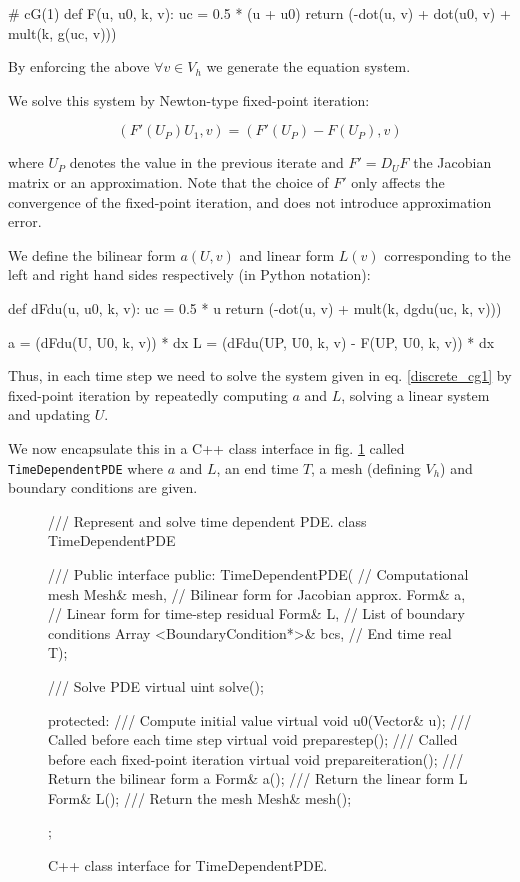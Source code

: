 \begin{python}
# cG(1)
def F(u, u0, k, v):
    uc = 0.5 * (u + u0)
    return (-dot(u, v) + dot(u0, v) + mult(k, g(uc, v)))
\end{python}

By enforcing the above $\forall v \in V_h$ we generate the equation system.

We solve this system by Newton-type fixed-point iteration:

\begin{equation}
(F'(U_P) U_1, v) = (F'(U_P) - F(U_P), v)
\label{discrete_cg1}
\end{equation}

where $U_P$ denotes the value in the previous iterate and $F' = D_U F$
the Jacobian matrix or an approximation. Note that the choice of $F'$
only affects the convergence of the fixed-point iteration, and does
not introduce approximation error.

We define the bilinear form $a(U, v)$ and linear form $L(v)$
corresponding to the left and right hand sides respectively (in Python
notation):


{\small
\begin{python}
def dFdu(u, u0, k, v):
    uc = 0.5 * u
    return (-dot(u, v) + mult(k, dgdu(uc, k, v)))

a = (dFdu(U, U0, k, v)) * dx
L = (dFdu(UP, U0, k, v) - F(UP, U0, k, v)) * dx
\end{python}
}

Thus, in each time step we need to solve the system given in
eq. \ref{discrete_cg1} by fixed-point iteration by repeatedly
computing $a$ and $L$, solving a linear system and updating $U$.

We now encapsulate this in a C++ class interface in
fig. \ref{code:TimeDependentPDE} called {\tt TimeDependentPDE} where
$a$ and $L$, an end time $T$, a mesh (defining $V_h$) and
boundary conditions are given.



\begin{figure}[!h]
\begin{c++}
/// Represent and solve time dependent PDE.
class TimeDependentPDE
{
  /// Public interface
public:
  TimeDependentPDE(
   // Computational mesh
   Mesh& mesh,
   // Bilinear form for Jacobian approx.
   Form& a,
   // Linear form for time-step residual
   Form& L,
   // List of boundary conditions
   Array <BoundaryCondition*>& bcs,
   // End time
   real T);

  /// Solve PDE
  virtual uint solve();

protected:
  /// Compute initial value
  virtual void u0(Vector& u);
  /// Called before each time step
  virtual void preparestep();
  /// Called before each fixed-point iteration
  virtual void prepareiteration();
  /// Return the bilinear form a
  Form& a();
  /// Return the linear form L
  Form& L();
  /// Return the mesh
  Mesh& mesh();
};
\end{c++}
\caption{
C++ class interface for TimeDependentPDE.
}
\label{code:TimeDependentPDE}
\end{figure}


